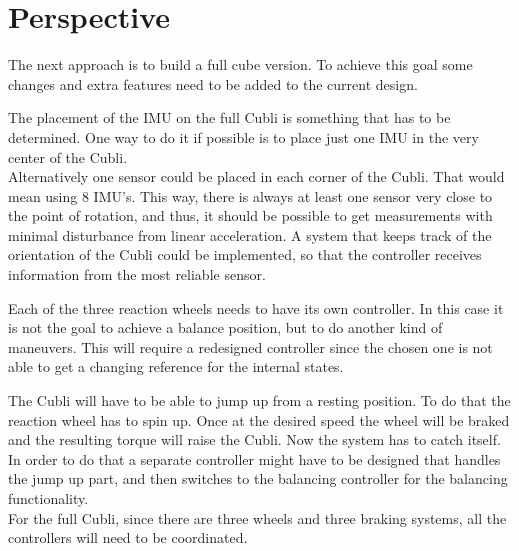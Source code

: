 \chapter{Perspective}
The next approach is to build a full cube version. To achieve this goal some changes and extra features need to be added to the current design.

The placement of the IMU on the full Cubli is something that has to be determined. One way to do it if possible is to place just one IMU in the very center of the Cubli.\\
Alternatively one sensor could be placed in each corner of the Cubli. That would mean using 8 IMU's. This way, there is always at least one sensor very close to the point of rotation, and thus, it should be possible to get measurements with minimal disturbance from linear acceleration. A system that keeps track of the orientation of the Cubli could be implemented, so that the controller receives information from the most reliable sensor.

Each of the three reaction wheels needs to have its own controller. In this case it is not the goal to achieve a balance position, but to do another kind of maneuvers. This will require a redesigned controller since the chosen one is not able to get a changing reference for the internal states.

The Cubli will have to be able to jump up from a resting position. To do that the reaction wheel has to spin up. Once at the desired speed the wheel will be braked and the resulting torque will raise the Cubli. Now the system has to catch itself. In order to do that a separate controller might have to be designed that handles the jump up part, and then switches to the balancing controller for the balancing functionality.\\
For the full Cubli, since there are three wheels and three braking systems, all the controllers will need to be coordinated.


